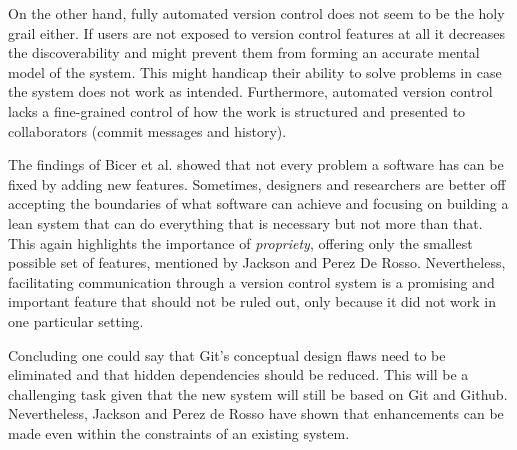 On the other hand, fully automated version control does not seem to be the holy grail either. If users are not exposed to version control features at all it decreases the discoverability and might prevent them from forming an accurate mental model of the system. This might handicap their ability to solve problems in case the system does not work as intended. Furthermore, automated version control lacks a fine-grained control of how the work is structured and presented to collaborators (commit messages and history).

The findings of Bicer et al. showed that not every problem a software has can be fixed by adding new features. Sometimes, designers and researchers are better off accepting the boundaries of what software can achieve and focusing on building a lean system that can do everything that is necessary but not more than that. This again highlights the importance of \textit{propriety}, offering only the smallest possible set of features, mentioned by Jackson and Perez De Rosso. Nevertheless, facilitating communication through a version control system is a promising and important feature that should not be ruled out, only because it did not work in one particular setting.

Concluding one could say that Git's conceptual design flaws need to be eliminated and that hidden dependencies should be reduced. This will be a challenging task given that the new system will still be based on Git and Github. Nevertheless, Jackson and Perez de Rosso have shown that enhancements can be made even within the constraints of an existing system. 
